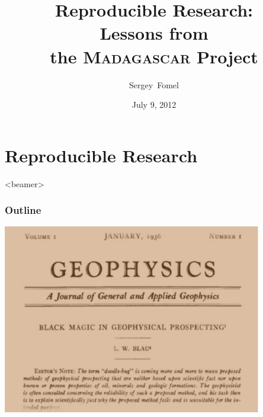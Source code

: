 \bfseries

\title[NAS Committee on Responsible Science]{Reproducible Research: \\ Lessons from \\ the \textsc{Madagascar} Project}

\author[S. Fomel]{Sergey~Fomel}


\date{July 9, 2012}


\newcommand{\quotebox}[3]{
  \begin{beamercolorbox}[wd=\textwidth,center]{quotecol}
    \begin{quote}
      #1 
      \color{blue}{\emph{#2}, #3}
    \end{quote}
    \end{beamercolorbox}
}

\begin{frame}
  \MadLogo
  \titlepage
\end{frame}

\section{Reproducible Research}


\begin{frame}<beamer>
  \frametitle{Outline}
  \tableofcontents[currentsection]
\end{frame}

\begin{frame}
\begin{center}
\vfill
\includegraphics[width=0.85\textwidth]{Fig/blackmagic}
\vfill
\end{center}
\end{frame}

